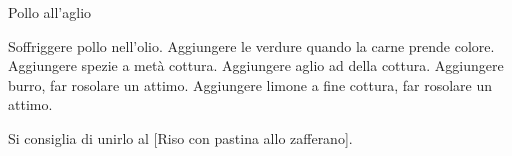 \begin{recipe}{Pollo all'aglio}
    \begin{header}

    \end{header}

    \begin{ingredients}[10]

        
    \end{ingredients}

    \begin{preparation}
        \step Soffriggere pollo nell'olio.
        \step Aggiungere le verdure quando la carne prende colore.
        \step Aggiungere spezie a metà cottura.
        \step Aggiungere aglio ad  della cottura.
        \step Aggiungere burro, far rosolare un attimo.
        \step Aggiungere limone a fine cottura, far rosolare un attimo.
    \end{preparation}

    \begin{suggestion}[3cm]
        \suggestionMark Si consiglia di unirlo al [Riso con pastina allo zafferano].
        
    \end{suggestion}
\end{recipe}
